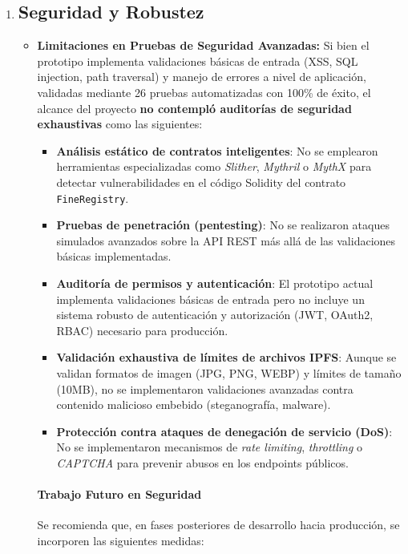 \begin{enumerate}
    \item \subsection{Seguridad y Robustez}
    \begin{itemize}
        \item \textbf{Limitaciones en Pruebas de Seguridad Avanzadas:} Si bien el prototipo implementa validaciones básicas de entrada (XSS, SQL injection, path traversal) y manejo de errores a nivel de aplicación, validadas mediante 26 pruebas automatizadas con 100\% de éxito, el alcance del proyecto \textbf{no contempló auditorías de seguridad exhaustivas} como las siguientes:

        \begin{itemize}
            \item \textbf{Análisis estático de contratos inteligentes}: No se emplearon herramientas especializadas como \textit{Slither}, \textit{Mythril} o \textit{MythX} para detectar vulnerabilidades en el código Solidity del contrato \texttt{FineRegistry}.

            \item \textbf{Pruebas de penetración (pentesting)}: No se realizaron ataques simulados avanzados sobre la API REST más allá de las validaciones básicas implementadas.

            \item \textbf{Auditoría de permisos y autenticación}: El prototipo actual implementa validaciones básicas de entrada pero no incluye un sistema robusto de autenticación y autorización (JWT, OAuth2, RBAC) necesario para producción.

            \item \textbf{Validación exhaustiva de límites de archivos IPFS}: Aunque se validan formatos de imagen (JPG, PNG, WEBP) y límites de tamaño (10MB), no se implementaron validaciones avanzadas contra contenido malicioso embebido (steganografía, malware).

            \item \textbf{Protección contra ataques de denegación de servicio (DoS)}: No se implementaron mecanismos de \textit{rate limiting}, \textit{throttling} o \textit{CAPTCHA} para prevenir abusos en los endpoints públicos.
        \end{itemize}

        \paragraph{Trabajo Futuro en Seguridad}
        Se recomienda que, en fases posteriores de desarrollo hacia producción, se incorporen las siguientes medidas:


\end{itemize}
\end{enumerate}
